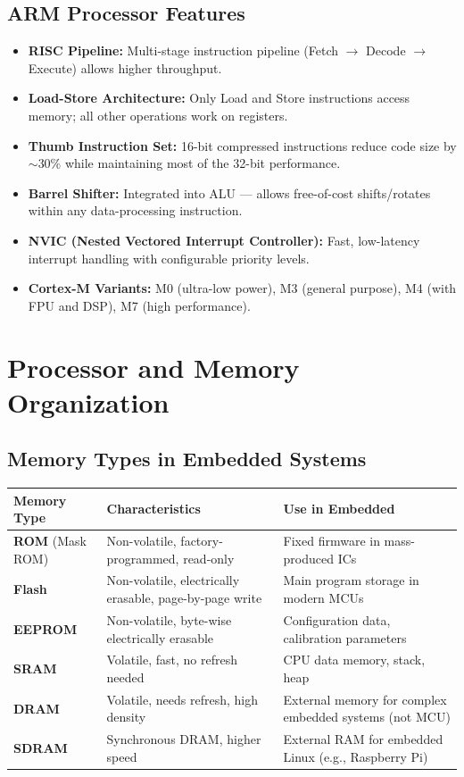 \documentclass[12pt,a4paper]{article}
\renewcommand{\arraystretch}{1.45}
\begin{document}
\subsection{ARM Processor Features}
\begin{itemize}[leftmargin=*, itemsep=3pt]
  \item \textbf{RISC Pipeline:} Multi-stage instruction pipeline (Fetch $\to$ Decode $\to$ Execute) allows higher throughput.
  \item \textbf{Load-Store Architecture:} Only Load and Store instructions access memory; all other operations work on registers.
  \item \textbf{Thumb Instruction Set:} 16-bit compressed instructions reduce code size by $\sim$30\% while maintaining most of the 32-bit performance.
  \item \textbf{Barrel Shifter:} Integrated into ALU --- allows free-of-cost shifts/rotates within any data-processing instruction.
  \item \textbf{NVIC (Nested Vectored Interrupt Controller):} Fast, low-latency interrupt handling with configurable priority levels.
  \item \textbf{Cortex-M Variants:} M0 (ultra-low power), M3 (general purpose), M4 (with FPU and DSP), M7 (high performance).
\end{itemize}

\section{Processor and Memory Organization}

\subsection{Memory Types in Embedded Systems}

\par\noindent
{\renewcommand{\arraystretch}{1.6}%
\begin{tabularx}{\linewidth}{|B{3.0cm}|Y|Y|}
\hline
\textbf{Memory Type} & \textbf{Characteristics} & \textbf{Use in Embedded} \\
\hline
\textbf{ROM} (Mask ROM) & Non-volatile, factory-programmed, read-only & Fixed firmware in mass-produced ICs \\
\hline
\textbf{Flash} & Non-volatile, electrically erasable, page-by-page write & Main program storage in modern MCUs \\
\hline
\textbf{EEPROM} & Non-volatile, byte-wise electrically erasable & Configuration data, calibration parameters \\
\hline
\textbf{SRAM} & Volatile, fast, no refresh needed & CPU data memory, stack, heap \\
\hline
\textbf{DRAM} & Volatile, needs refresh, high density & External memory for complex embedded systems (not MCU) \\
\hline
\textbf{SDRAM} & Synchronous DRAM, higher speed & External RAM for embedded Linux (e.g., Raspberry Pi) \\
\hline
\end{tabularx}}
\end{document}
